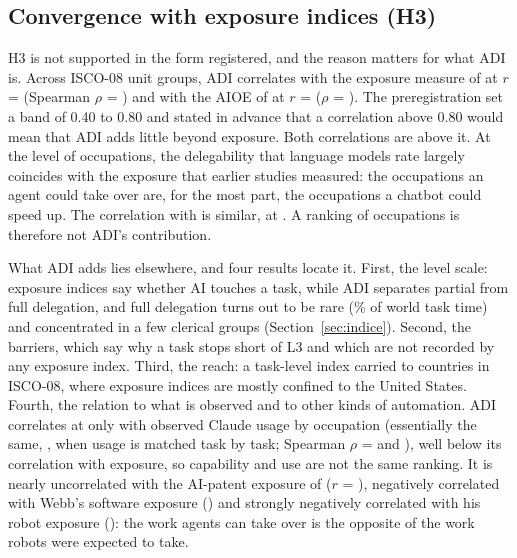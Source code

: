 \subsection{Convergence with exposure indices (H3)}

H3 is not supported in the form registered, and the reason matters for what ADI is.
Across ISCO-08 unit groups, ADI correlates with the exposure measure of \citet{eloundou2024gpts} at $r$ =  (Spearman $\rho$ = ) and with the AIOE of \citet{felten2021occupational} at $r$ =  ($\rho$ = ).
The preregistration set a band of 0.40 to 0.80 and stated in advance that a correlation above 0.80 would mean that ADI adds little beyond exposure.
Both correlations are above it.
At the level of occupations, the delegability that language models rate largely coincides with the exposure that earlier studies measured: the occupations an agent could take over are, for the most part, the occupations a chatbot could speed up.
The correlation with \citet{eisfeldt2023generative} is similar, at .
A ranking of occupations is therefore not ADI's contribution.

What ADI adds lies elsewhere, and four results locate it.
First, the level scale: exposure indices say whether AI touches a task, while ADI separates partial from full delegation, and full delegation turns out to be rare (\% of world task time) and concentrated in a few clerical groups (Section~\ref{sec:indice}).
Second, the barriers, which say why a task stops short of L3 and which are not recorded by any exposure index.
Third, the reach: a task-level index carried to  countries in ISCO-08, where exposure indices are mostly confined to the United States.
Fourth, the relation to what is observed and to other kinds of automation.
ADI correlates at only  with observed Claude usage by occupation \citep{handa2025economic} (essentially the same, , when usage is matched task by task; Spearman $\rho$ =  and ), well below its correlation with exposure, so capability and use are not the same ranking.
It is nearly uncorrelated with the AI-patent exposure of \citet{webb2020impact} ($r$ = ), negatively correlated with Webb's software exposure () and strongly negatively correlated with his robot exposure (): the work agents can take over is the opposite of the work robots were expected to take.

